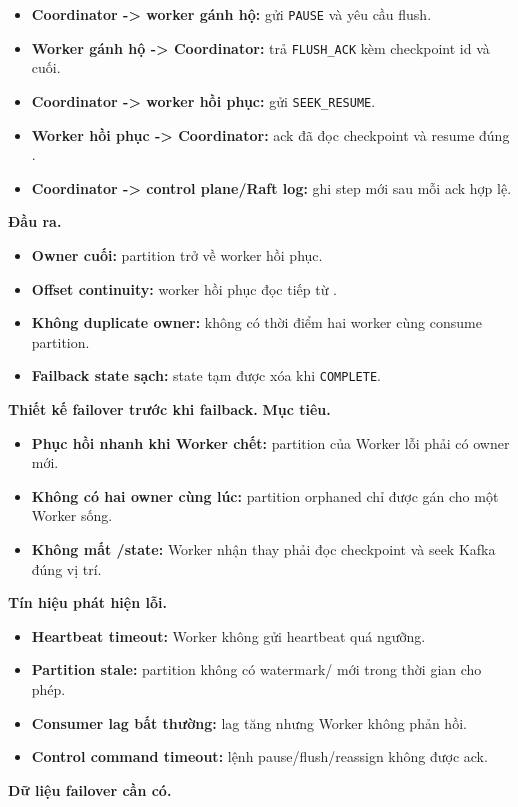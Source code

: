 \documentclass[12pt,a4paper]{article}
\begin{document}
\begin{itemize}
\item \textbf{Coordinator -> worker gánh hộ:} gửi \texttt{PAUSE} và yêu cầu flush.
\item \textbf{Worker gánh hộ -> Coordinator:} trả \texttt{FLUSH\_ACK} kèm checkpoint id và  cuối.
\item \textbf{Coordinator -> worker hồi phục:} gửi \texttt{SEEK\_RESUME}.
\item \textbf{Worker hồi phục -> Coordinator:} ack đã đọc checkpoint và resume đúng .
\item \textbf{Coordinator -> control plane/Raft log:} ghi step mới sau mỗi ack hợp lệ.
\end{itemize}
\textbf{Đầu ra.}

\begin{itemize}
\item \textbf{Owner cuối:} partition trở về worker hồi phục.
\item \textbf{Offset continuity:} worker hồi phục đọc tiếp từ .
\item \textbf{Không duplicate owner:} không có thời điểm hai worker cùng consume partition.
\item \textbf{Failback state sạch:} state tạm được xóa khi \texttt{COMPLETE}.
\end{itemize}
\textbf{Thiết kế failover trước khi failback.}
\textbf{Mục tiêu.}

\begin{itemize}
\item \textbf{Phục hồi nhanh khi Worker chết:} partition của Worker lỗi phải có owner mới.
\item \textbf{Không có hai owner cùng lúc:} partition orphaned chỉ được gán cho một Worker sống.
\item \textbf{Không mất /state:} Worker nhận thay phải đọc checkpoint và seek Kafka đúng vị trí.
\end{itemize}
\textbf{Tín hiệu phát hiện lỗi.}

\begin{itemize}
\item \textbf{Heartbeat timeout:} Worker không gửi heartbeat quá ngưỡng.
\item \textbf{Partition stale:} partition không có watermark/ mới trong thời gian cho phép.
\item \textbf{Consumer lag bất thường:} lag tăng nhưng Worker không phản hồi.
\item \textbf{Control command timeout:} lệnh pause/flush/reassign không được ack.
\end{itemize}
\textbf{Dữ liệu failover cần có.}
\end{document}
